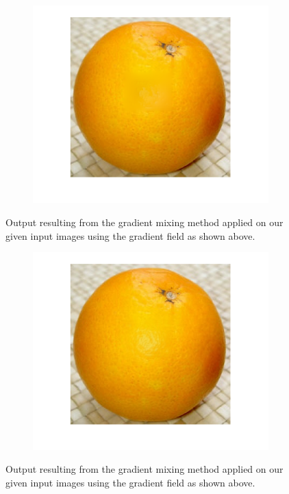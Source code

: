 \documentclass{paper}
\begin{document}
\begin{figure}[H]
    \centering
    \begin{subfigure}{1.0\textwidth}
        \includegraphics[width=\textwidth]{../../outputs/p4/highlight_removal/output_alphacompression}
    \end{subfigure}
    \caption{Output resulting from the gradient mixing method applied on our given input images using the gradient field as shown above.}
    \label{fig:highlight_removal_out_alphacompression}       
\end{figure}

\begin{figure}[H]
    \centering
    \begin{subfigure}{1.0\textwidth}
        \includegraphics[width=\textwidth]{../../outputs/p4/highlight_removal/output_gammacompression}
    \end{subfigure}
    \caption{Output resulting from the gradient mixing method applied on our given input images using the gradient field as shown above.}
    \label{fig:highlight_removal_out_gammacompression}       
\end{figure}
\end{document}
